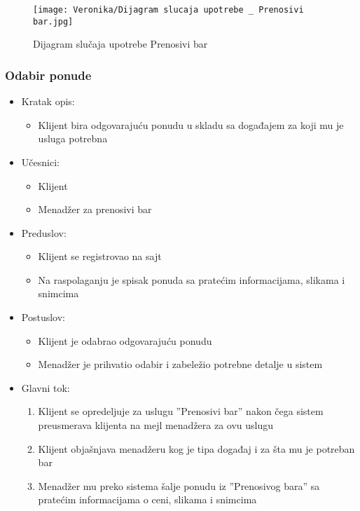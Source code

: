 \documentclass[a4paper]{article}
\begin{document}
\begin{figure}[H]
    \centering
    \texttt{[image: Veronika/Dijagram slucaja upotrebe \_ Prenosivi bar.jpg]}
    \caption{Dijagram slučaja upotrebe Prenosivi bar}
    \label{fig:PrenosiviBar}
\end{figure}

\subsubsection{Odabir ponude}

\begin{itemize}
    \item Kratak opis:
        \begin{itemize}
            \item Klijent bira odgovarajuću ponudu u skladu sa događajem za koji mu je usluga potrebna
        \end{itemize}
    \item Učesnici:
        \begin{itemize}
            \item Klijent
            \item Menadžer za prenosivi bar
        \end{itemize}
    \item Preduslov:
        \begin{itemize}
            \item Klijent se registrovao na sajt
		    \item Na raspolaganju je spisak ponuda sa pratećim informacijama, slikama i snimcima
        \end{itemize}
    \item Postuslov:
        \begin{itemize}
            \item Klijent je odabrao odgovarajuću ponudu
            \item Menadžer je prihvatio odabir i zabeležio potrebne detalje u sistem
        \end{itemize}
    \item Glavni tok:
        \begin{enumerate}
		    \item Klijent se opredeljuje za uslugu ''Prenosivi bar''
		   nakon čega sistem preusmerava klijenta na mejl menadžera za ovu uslugu
		    \item Klijent objašnjava menadžeru kog je tipa događaj i za šta mu je potreban bar
		    \item Menadžer mu preko sistema šalje ponudu iz ''Prenosivog bara'' sa pratećim informacijama o ceni, slikama i snimcima

\end{enumerate}
\end{itemize}
\end{document}
